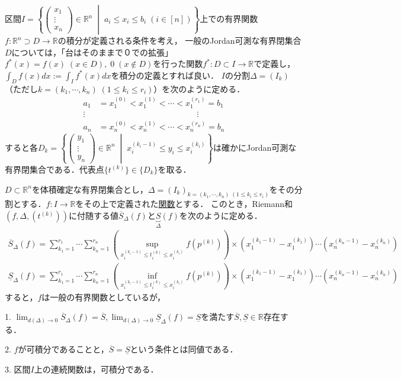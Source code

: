 \documentclass[uplatex, dvipdfmx]{jsreport}
\begin{document}
区間$I=\left\{ \left(\begin{array}{c}x_1 \\ \vdots \\ x_n\end{array}\right)\in\mathbb{R}^n\;\middle|\; a_i\le x_i\le b_i\; (i\in [n]) \right\}$上での有界関数$f:\mathbb{R}^n\supset D\to\mathbb{R}$の積分が定義される条件を考え，
一般のJordan可測な有界閉集合$D$については，「台はそのままで０での拡張」$f^*(x)=f(x)\;(x\in D),\; 0\;(x\notin D)$を行った関数$f^*:D\subset I\to\mathbb{R}$で定義し，$\int_Df(x)dx:=\int_If^*(x)dx$を積分の定義とすれば良い．
$I$の分割$\Delta=(I_k)$（ただし$k=(k_1,\cdots,k_n)\; (1\le k_i\le r_i)$）を次のように定める．
\begin{align*}
    a_1&=x_1^{(0)}<x_1^{(1)}<\cdots<x_1^{(r_1)}=b_1 \\
    \vdots&\hspace{5cm}\vdots \\
    a_n&=x_n^{(0)}<x_n^{(1)}<\cdots<x_n^{(r_n)}=b_n
\end{align*}
すると各$D_k=\left\{ \left(\begin{array}{c}y_1 \\ \vdots \\ y_n\end{array}\right)\in\mathbb{R}^n\;\middle| \; x_i^{(k_i-1)}\le y_i\le x_i^{(k_i)} \right\}$は確かにJordan可測な有界閉集合である．代表点$\{t^{(k)}\}\in\{D_k\}$を取る．

\begin{theorem}[Darboux]
    $D\subset\mathbb{R}^n$を体積確定な有界閉集合とし，$\Delta=(I_k)_{k=(k_1,\cdots,k_n)\; (1\le k_i\le r_i)}$をその分割とする．$f:I\to\mathbb{R}$をその上で定義された\underline{関数}とする．
    このとき，Riemann和$(f,\Delta,(t^{(k)}))$に付随する値$\overline{S}_\Delta(f)$と$\underbrace{S}_\Delta (f)$を次のように定める．
    \begin{align*}
        \overline{S}_\Delta (f) = \sum^{r_1}_{k_1=1}\cdots\sum^{r_n}_{k_n=1}\left( \sup_{x_i^{(k_i-1)}\le t_i^{(k)}\le x_i^{(k_i)}} f(p^{(k)})\right)\times (x_1^{(k_1-1)}-x_1^{(k_1)})\cdots (x_n^{(k_n-1)}-x_n^{(k_n)})\\
        \underline{S}_\Delta (f) = \sum^{r_1}_{k_1=1}\cdots\sum^{r_n}_{k_n=1}\left( \inf_{x_i^{(k_i-1)}\le t_i^{(k)}\le x_i^{(k_i)}} f(p^{(k)})\right)\times (x_1^{(k_1-1)}-x_1^{(k_1)})\cdots (x_n^{(k_n-1)}-x_n^{(k_n)})
    \end{align*}
    すると，$f$は一般の有界関数としているが，

    1. $\lim_{d(\Delta)\to 0}\overline{S}_\Delta (f)=\overline{S}, \lim_{d(\Delta)\to 0}\underline{S}_\Delta (f)=\underline{S}$を満たす$\overline{S},\underline{S}\in\mathbb{R}$存在する．

    2. $f$が可積分であることと，$\overline{S}=\underline{S}$という条件とは同値である．

    3. 区間$I$上の連続関数は，可積分である．
\end{theorem}
\end{document}
